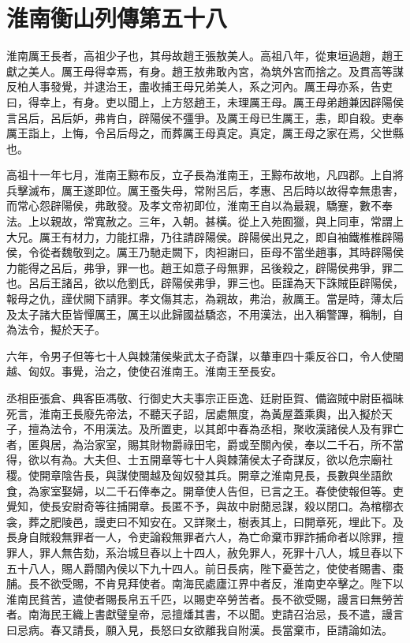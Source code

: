 \chapter{淮南衡山列傳第五十八}

淮南厲王長者，高祖少子也，其母故趙王張敖美人。高祖八年，從東垣過趙，趙王獻之美人。厲王母得幸焉，有身。趙王敖弗敢內宮，為筑外宮而捨之。及貫高等謀反柏人事發覺，并逮治王，盡收捕王母兄弟美人，系之河內。厲王母亦系，告吏曰，得幸上，有身。吏以聞上，上方怒趙王，未理厲王母。厲王母弟趙兼因辟陽侯言呂后，呂后妒，弗肯白，辟陽侯不彊爭。及厲王母已生厲王，恚，即自殺。吏奉厲王詣上，上悔，令呂后母之，而葬厲王母真定。真定，厲王母之家在焉，父世縣也。

高祖十一年七月，淮南王黥布反，立子長為淮南王，王黥布故地，凡四郡。上自將兵擊滅布，厲王遂即位。厲王蚤失母，常附呂后，孝惠、呂后時以故得幸無患害，而常心怨辟陽侯，弗敢發。及孝文帝初即位，淮南王自以為最親，驕蹇，數不奉法。上以親故，常寬赦之。三年，入朝。甚橫。從上入苑囿獵，與上同車，常謂上大兄。厲王有材力，力能扛鼎，乃往請辟陽侯。辟陽侯出見之，即自袖鐵椎椎辟陽侯，令從者魏敬剄之。厲王乃馳走闕下，肉袒謝曰，臣母不當坐趙事，其時辟陽侯力能得之呂后，弗爭，罪一也。趙王如意子母無罪，呂後殺之，辟陽侯弗爭，罪二也。呂后王諸呂，欲以危劉氏，辟陽侯弗爭，罪三也。臣謹為天下誅賊臣辟陽侯，報母之仇，謹伏闕下請罪。孝文傷其志，為親故，弗治，赦厲王。當是時，薄太后及太子諸大臣皆憚厲王，厲王以此歸國益驕恣，不用漢法，出入稱警蹕，稱制，自為法令，擬於天子。

六年，令男子但等七十人與棘蒲侯柴武太子奇謀，以輂車四十乘反谷口，令人使閩越、匈奴。事覺，治之，使使召淮南王。淮南王至長安。

丞相臣張倉、典客臣馮敬、行御史大夫事宗正臣逸、廷尉臣賀、備盜賊中尉臣福昧死言，淮南王長廢先帝法，不聽天子詔，居處無度，為黃屋蓋乘輿，出入擬於天子，擅為法令，不用漢法。及所置吏，以其郎中春為丞相，聚收漢諸侯人及有罪亡者，匿與居，為治家室，賜其財物爵祿田宅，爵或至關內侯，奉以二千石，所不當得，欲以有為。大夫但、士五開章等七十人與棘蒲侯太子奇謀反，欲以危宗廟社稷。使開章陰告長，與謀使閩越及匈奴發其兵。開章之淮南見長，長數與坐語飲食，為家室娶婦，以二千石俸奉之。開章使人告但，已言之王。春使使報但等。吏覺知，使長安尉奇等往捕開章。長匿不予，與故中尉蕑忌謀，殺以閉口。為棺槨衣衾，葬之肥陵邑，謾吏曰不知安在。又詳聚土，樹表其上，曰開章死，埋此下。及長身自賊殺無罪者一人，令吏論殺無罪者六人，為亡命棄市罪詐捕命者以除罪，擅罪人，罪人無告劾，系治城旦舂以上十四人，赦免罪人，死罪十八人，城旦舂以下五十八人，賜人爵關內侯以下九十四人。前日長病，陛下憂苦之，使使者賜書、棗脯。長不欲受賜，不肯見拜使者。南海民處廬江界中者反，淮南吏卒擊之。陛下以淮南民貧苦，遣使者賜長帛五千匹，以賜吏卒勞苦者。長不欲受賜，謾言曰無勞苦者。南海民王織上書獻璧皇帝，忌擅燔其書，不以聞。吏請召治忌，長不遣，謾言曰忌病。春又請長，願入見，長怒曰女欲離我自附漢。長當棄市，臣請論如法。


